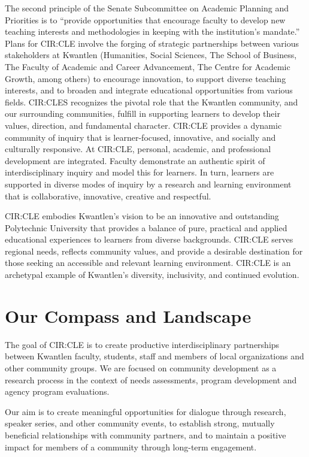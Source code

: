 \documentclass[12pt,DIV11,letterpaper,oneside,abstractoff,headsepline]{scrreprt}
\begin{document}
The second principle of the Senate Subcommittee on Academic Planning and Priorities is to ``provide opportunities that encourage faculty to develop new teaching interests and methodologies in keeping with the institution’s mandate.'' Plans for CIR:CLE involve the forging of strategic partnerships between various stakeholders at Kwantlen (Humanities, Social Sciences, The School of Business, The Faculty of Academic and Career Advancement, The Centre for Academic Growth, among others) to encourage innovation, to support diverse teaching interests, and to broaden and integrate educational opportunities from various fields. CIR:CLES recognizes the pivotal role that the Kwantlen community, and our surrounding communities, fulfill in supporting learners to develop their values, direction, and fundamental character. CIR:CLE provides a dynamic community of inquiry that is learner-focused, innovative, and socially and culturally responsive. At CIR:CLE, personal, academic, and professional development are integrated. Faculty demonstrate an authentic spirit of interdisciplinary inquiry and model this for learners. In turn, learners are supported in diverse modes of inquiry by a research and learning environment that is collaborative, innovative, creative and respectful.

CIR:CLE embodies Kwantlen’s vision to be an innovative and outstanding Polytechnic University that provides a balance of pure, practical and applied educational experiences to learners from diverse backgrounds. CIR:CLE serves regional needs, reflects community values, and provide a desirable destination for those seeking an accessible and relevant learning environment. CIR:CLE is an archetypal example of Kwantlen’s diversity, inclusivity, and continued evolution.
\newpage
\section{Our Compass and Landscape}
\label{sec-2}

The goal of CIR:CLE is to create productive interdisciplinary partnerships between Kwantlen faculty, students, staff and members of local organizations and other community groups. We are focused on community development as a research process in the context of needs assessments, program development and agency program evaluations. 

Our aim is to create meaningful opportunities for dialogue through research, speaker series, and other community events, to establish strong, mutually beneficial relationships with community partners, and to maintain a positive impact for members of a community through long-term engagement.
\end{document}
